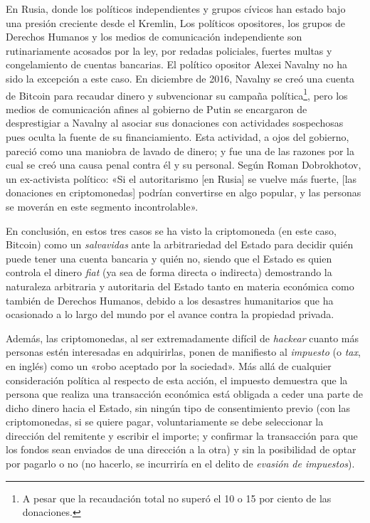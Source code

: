 \documentclass[12pt,a4paper,twoside]{book}
\begin{document}
En Rusia, donde los políticos independientes y grupos cívicos han estado bajo una presión creciente desde el Kremlin, Los políticos opositores, los grupos de Derechos Humanos y los medios de comunicación independiente son rutinariamente acosados por la ley, por redadas policiales, fuertes multas y congelamiento de cuentas bancarias. El político opositor Alexei Navalny no ha sido la excepción a este caso. En diciembre de 2016, Navalny se creó una cuenta de Bitcoin para recaudar dinero y subvencionar su campaña política\footnote{A pesar que la recaudación total no superó el 10 o 15 por ciento de las donaciones.}, pero los medios de comunicación afines al gobierno de Putin se encargaron de desprestigiar a Navalny al asociar sus donaciones con actividades sospechosas pues oculta la fuente de su financiamiento. Esta actividad, a ojos del gobierno, pareció como una maniobra de lavado de dinero; y fue una de las razones por la cual se creó una causa penal contra él y su personal. Según Roman Dobrokhotov, un ex-activista político: «Si el autoritarismo [en Rusia] se vuelve más fuerte, [las donaciones en criptomonedas] podrían convertirse en algo popular, y las personas se moverán en este segmento incontrolable». \cite{bitcoin:rusia}

En conclusión, en estos tres casos se ha visto la criptomoneda (en este caso, Bitcoin) como un \textit{salvavidas} ante la arbitrariedad del Estado para decidir quién puede tener una cuenta bancaria y quién no, siendo que el Estado es quien controla el dinero \textit{fiat} (ya sea de forma directa o indirecta) demostrando la naturaleza arbitraria y autoritaria del Estado tanto en materia económica como también de Derechos Humanos, debido a los desastres humanitarios que ha ocasionado a lo largo del mundo por el avance contra la propiedad privada. 

Además, las criptomonedas, al ser extremadamente difícil de \textit{hackear} cuanto más personas estén interesadas en adquirirlas, ponen de manifiesto al \textit{impuesto} (o \textit{tax}, en inglés) como un «robo aceptado por la sociedad». Más allá de cualquier consideración política al respecto de esta acción, el impuesto demuestra que la persona que realiza una transacción económica está obligada a ceder una parte de dicho dinero hacia el Estado, sin ningún tipo de consentimiento previo (con las criptomonedas, si se quiere pagar, voluntariamente se debe seleccionar la dirección del remitente y escribir el importe; y confirmar la transacción para que los fondos sean enviados de una dirección a la otra) y sin la posibilidad de optar por pagarlo o no (no hacerlo, se incurriría en el delito de \textit{evasión de impuestos}).
\end{document}
